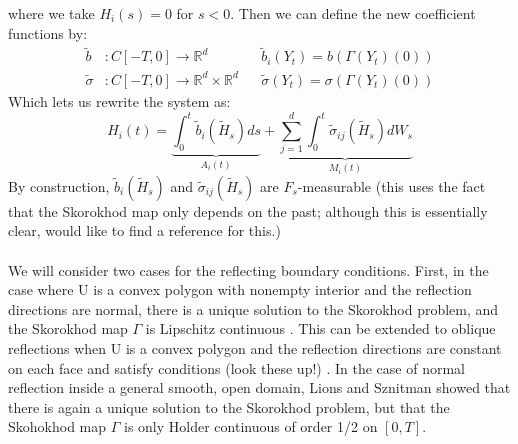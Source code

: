 \documentclass[]{article}
\theoremstyle{definition}
\theoremstyle{assumption}
\theoremstyle{remark}
\begin{document}
where we take $H_i(s) = 0$ for $s < 0$. Then we can define the new coefficient functions by:
\begin{align*}
\tilde{b}&: C[-T, 0] \rightarrow \mathbb{R}^d && \tilde{b}_i(Y_t) = b( \Gamma(Y_t)(0)) \\
\tilde{\sigma}&: C[-T, 0] \rightarrow \mathbb{R}^d \times \mathbb{R}^d && \tilde{\sigma}(Y_t) = \sigma(\Gamma(Y_t)(0))
\end{align*}
Which lets us rewrite the system as:
\begin{equation} \label{eq:fSDE}
H_i(t) =  \underbrace{ \int_0^t \tilde{b}_i(\tilde{H}_s) ds}_{A_i(t)}+ \underbrace{\sum_{j=1}^d \int_0^t  \tilde{\sigma}_{ij}(\tilde{H}_s)dW_s }_{M_i(t)}
\end{equation}
By construction, $\tilde{b}_i(\tilde{H}_s)$ and $\tilde{\sigma}_{ij}(\tilde{H}_s)$ are $F_s$-measurable (this uses the fact that the Skorokhod map only depends on the past; although this is essentially clear, would like to find a reference for this.) \\ \\

We will consider two cases for the reflecting boundary conditions. First, in the case where U is a convex polygon with nonempty interior and the reflection directions are normal, there is a unique solution to the Skorokhod problem, and the Skorokhod map $\Gamma$ is Lipschitz continuous \cite{Dupuis91}. This can be extended to oblique reflections when U is a convex polygon and the reflection directions are constant on each face and satisfy conditions (look these up!) \cite{Dupuis91}. In the case of normal reflection inside a general smooth, open domain, Lions and Sznitman \cite[Theorem 1.1]{Lions84} showed that there is again a unique solution to the Skorokhod problem, but that the Skohokhod map $\Gamma$ is only Holder continuous of order 1/2 on $[0, T]$.
\end{document}
